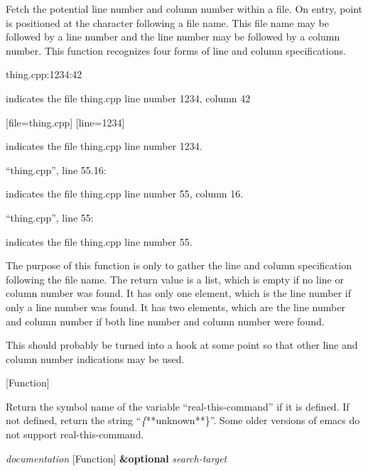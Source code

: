 \begin{doc-string}
Fetch the potential line number and column number within a file.  On entry,
point is positioned at the character following a file name.  This file name
may be followed by a line number and the line number may be followed by a
column number.  This function recognizes four forms of line and column
specifications.

  thing.cpp:1234:42

indicates the file thing.cpp line number 1234, column 42

  [file=thing.cpp] [line=1234]

indicates the file thing.cpp line number 1234.

  ``thing.cpp'', line 55.16:

indicates the file thing.cpp line number 55, column 16.

  ``thing.cpp'', line 55:

indicates the file thing.cpp line number 55.

The purpose of this function is only to gather the line and column
specification following the file name.  The return value is a list, which is
empty if no line or column number was found.  It has only one element, which
is the line number if only a line number was found.  It has two elements,
which are the line number and column number if both line number and column
number were found.

This should probably be turned into a hook at some point so that other line
and column number indications may be used.
\end{doc-string}

\vspace{1em}
\noindent
{}
\usebox{\funcname}
 \hfill [Function]

\begin{doc-string}
Return the symbol name of the variable ``real-this-command'' if it is defined.
If not defined, return the string ``\emph\{**unknown**\}''.  Some older versions of emacs
do not support real-this-command.
\end{doc-string}

\vspace{1em}
\noindent
{}
\usebox{\funcname}\emph{documentation}
 \hfill [Function]
\hspace*{\wd\funcname}\textbf{\&optional} \emph{search-target}
\hspace*{\wd\funcname}

